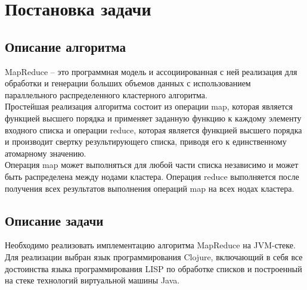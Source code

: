 \documentclass[document.tex]{subfiles}
\begin{document}
\newpage
{}

\section{Постановка задачи}
\subsection{Описание алгоритма}
\begin{flushleft}
  MapReduce -- это программная модель и ассоциированная с ней реализация
  для обработки и генерации больших объемов данных с использованием параллельного
  распределенного кластерного алгоритма. \\
  Простейшая реализация алгоритма состоит из операции map, которая является
  функцией высшего порядка и применяет заданную функцию к каждому элементу
  входного списка и операции reduce, которая является функцией высшего порядка
  и производит свертку результирующего списка, приводя его к единственному
  атомарному значению. \\
  Операция map может выполняться для любой части списка независимо и может
  быть распределена между нодами кластера. Операция reduce выполняется после
  получения всех результатов выполнения операций map на всех нодах кластера.
\end{flushleft}

\subsection{Описание задачи}
\begin{flushleft}
  Необходимо реализовать имплементацию алгоритма MapReduce на JVM-стеке. \\
  Для реализации выбран язык программирования Clojure, включающий в себя все
  достоинства языка программирования LISP по обработке списков и построенный на
  стеке технологий виртуальной машины Java.
\end{flushleft}
\end{document}
